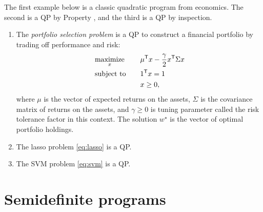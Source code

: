 \begin{Example}
The first example below is a classic quadratic program from economics. The
second is a QP by Property , and the third is a QP by
inspection.     

\begin{enumerate}[label=\alph*.]
\item The \emph{portfolio selection problem} is a QP to construct a financial
  portfolio by trading off performance and risk:  
  \begin{alignat*}{2}
  &\operatorname*{maximize}_x \quad && \mu^{\mathsf{T}} x - \frac{\gamma}{2} x^{\mathsf{T}} \Sigma x \\ 
  &\operatorname{subject\,\,to} \quad && 1^{\mathsf{T}} x = 1 \\
  & && x \geq 0,
  \end{alignat*}
  where $\mu$ is the vector of expected returns on the assets, $\Sigma$ is the 
  covariance matrix of returns on the assets, and $\gamma \geq 0$ is tuning
  parameter called the risk tolerance factor in this context. The solution
  $w^\star$ is the vector of optimal portfolio holdings. 

\item The lasso problem \eqref{eq:lasso} is a QP. 

\item The SVM problem \eqref{eq:svm} is a QP.
\end{enumerate}
\end{Example}

\section{Semidefinite programs}
\label{sec:semidefinite_programs}

